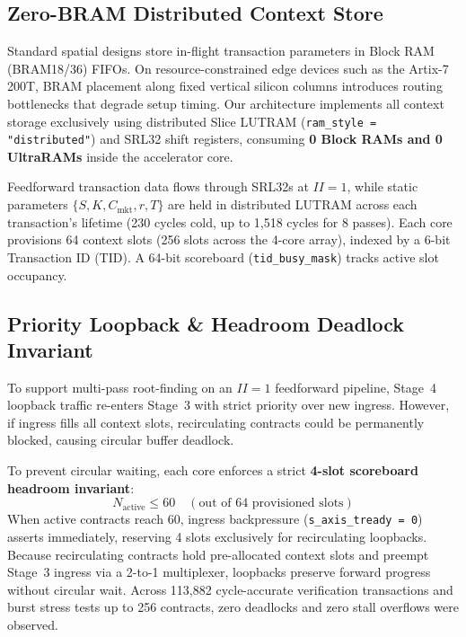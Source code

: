 \documentclass[sigconf,anonymous,review]{acmart}
\begin{document}
\subsection{Zero-BRAM Distributed Context Store}
Standard spatial designs store in-flight transaction parameters in Block RAM (BRAM18/36) FIFOs. On resource-constrained edge devices such as the Artix-7 200T, BRAM placement along fixed vertical silicon columns introduces routing bottlenecks that degrade setup timing. Our architecture implements all context storage exclusively using distributed Slice LUTRAM (\texttt{ram\_style = "distributed"}) and SRL32 shift registers, consuming \textbf{0 Block RAMs and 0 UltraRAMs} inside the accelerator core.

Feedforward transaction data flows through SRL32s at $II=1$, while static parameters $\{S, K, C_{\text{mkt}}, r, T\}$ are held in distributed LUTRAM across each transaction's lifetime (230 cycles cold, up to 1,518 cycles for 8 passes). Each core provisions 64 context slots (256 slots across the 4-core array), indexed by a 6-bit Transaction ID (TID). A 64-bit scoreboard (\texttt{tid\_busy\_mask}) tracks active slot occupancy.

\subsection{Priority Loopback \& Headroom Deadlock Invariant}
To support multi-pass root-finding on an $II=1$ feedforward pipeline, Stage~4 loopback traffic re-enters Stage~3 with strict priority over new ingress. However, if ingress fills all context slots, recirculating contracts could be permanently blocked, causing circular buffer deadlock.

To prevent circular waiting, each core enforces a strict \textbf{4-slot scoreboard headroom invariant}:
\begin{equation}
    N_{\text{active}} \le 60 \quad (\text{out of 64 provisioned slots})
    \label{eq:headroom}
\end{equation}
When active contracts reach 60, ingress backpressure (\texttt{s\_axis\_}\allowbreak\texttt{tready = 0}) asserts immediately, reserving 4 slots exclusively for recirculating loopbacks. Because recirculating contracts hold pre-allocated context slots and preempt Stage~3 ingress via a 2-to-1 multiplexer, loopbacks preserve forward progress without circular wait. Across 113,882 cycle-accurate verification transactions and burst stress tests up to 256 contracts, zero deadlocks and zero stall overflows were observed.
\end{document}
